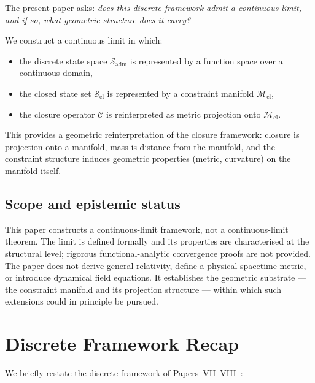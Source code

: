 \documentclass[12pt]{article}
\newcommand{\Mcl}{\mathcal{M}_{\mathrm{cl}}}
\newcommand{\Ccal}{\mathcal{C}}
\newcommand{\Sadm}{\mathcal{S}_{\mathrm{adm}}}
\newcommand{\Scl}{\mathcal{S}_{\mathrm{cl}}}
\begin{document}
The present paper asks: \textit{does this discrete framework admit a continuous limit, and if so, what geometric structure does it carry?}

We construct a continuous limit in which:
\begin{itemize}
    \item the discrete state space $\Sadm$ is represented by a function space over a continuous domain,
    \item the closed state set $\Scl$ is represented by a constraint manifold $\Mcl$,
    \item the closure operator $\Ccal$ is reinterpreted as metric projection onto $\Mcl$.
\end{itemize}

This provides a geometric reinterpretation of the closure framework: closure is projection onto a manifold, mass is distance from the manifold, and the constraint structure induces geometric properties (metric, curvature) on the manifold itself.

\subsection*{Scope and epistemic status}

This paper constructs a continuous-limit framework, not a continuous-limit theorem. The limit is defined formally and its properties are characterised at the structural level; rigorous functional-analytic convergence proofs are not provided. The paper does not derive general relativity, define a physical spacetime metric, or introduce dynamical field equations. It establishes the geometric substrate --- the constraint manifold and its projection structure --- within which such extensions could in principle be pursued.

\section{Discrete Framework Recap}\label{sec:recap}

We briefly restate the discrete framework of Papers~VII--VIII~\citep{SmartVII, SmartVIII}:
\end{document}

